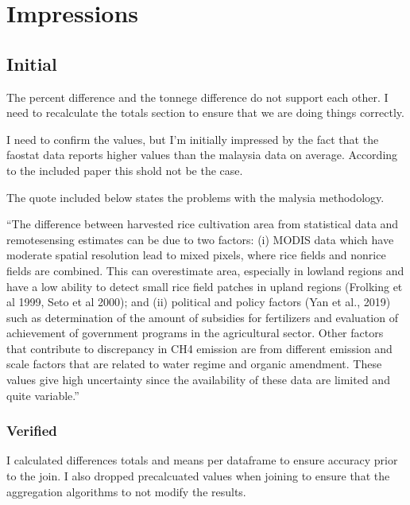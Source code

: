 \documentclass[letterpaper,10pt,english]{jupyterBook}
\begin{document}
\section{Impressions}
\label{\detokenize{notebooks/data_exploration:impressions}}

\subsection{Initial}
\label{\detokenize{notebooks/data_exploration:initial}}
\sphinxAtStartPar
The percent difference and the tonnege difference do not support each other.  I need to recalculate the totals section to ensure that we are doing things correctly.

\sphinxAtStartPar
I need to confirm the values, but I’m initially impressed by the fact that the faostat data reports higher values than the malaysia data on average.  According to the included paper this shold not be the case.

\sphinxAtStartPar
The quote included below states the problems with the malysia methodology.

\sphinxAtStartPar
“The difference between harvested rice cultivation area from statistical data and remote\sphinxhyphen{}sensing estimates can be due to two factors: (i) MODIS data which have moderate spatial resolution lead to mixed pixels, where rice fields and non\sphinxhyphen{}rice fields are combined. This can overestimate area, especially in lowland regions and have a low ability to detect small rice field patches in upland regions (Frolking et al 1999, Seto et al 2000); and (ii) political and policy factors (Yan et al., 2019) such as determination of the amount of subsidies for fertilizers and evaluation of achievement of government programs in the agricultural sector.
Other factors that contribute to discrepancy in CH4 emission are from different emission and scale factors that are related to water regime and organic amendment. These values give high uncertainty since the availability of these data are limited and quite variable.”


\subsubsection{Verified}
\label{\detokenize{notebooks/data_exploration:verified}}
\sphinxAtStartPar
I calculated differences totals and means per dataframe to ensure accuracy prior to the join.  I also dropped precalcuated values when joining to ensure that the aggregation algorithms to not modify the results.
\end{document}
